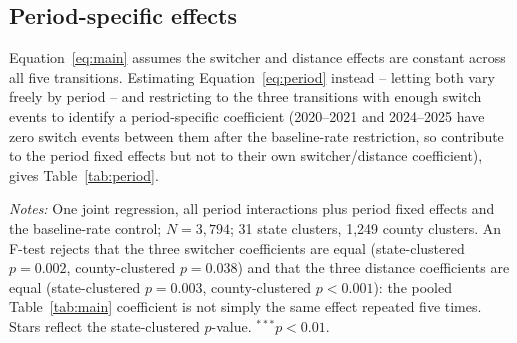 \documentclass[preprint,12pt,authoryear]{elsarticle}
\begin{document}
\subsection{Period-specific effects}
\label{sec:periodeffects}

Equation~\ref{eq:main} assumes the switcher and distance effects are
constant across all five transitions. Estimating Equation~\ref{eq:period}
instead -- letting both vary freely by period -- and restricting to
the three transitions with enough switch events to identify a
period-specific coefficient (2020--2021 and 2024--2025 have zero
switch events between them after the baseline-rate restriction, so
contribute to the period fixed effects but not to their own
switcher/distance coefficient), gives Table~\ref{tab:period}.

\begin{table}[htbp]
\centering
\caption{Period-specific switcher and distance coefficients}
\label{tab:period}
\vspace{2pt}
\begin{minipage}{0.9\textwidth}
\footnotesize\emph{Notes:} One joint regression, all period
interactions plus period fixed effects and the baseline-rate control;
$N=3{,}794$; 31 state clusters, 1{,}249 county clusters. An F-test
rejects that the three switcher coefficients are equal (state-clustered
$p=0.002$, county-clustered $p=0.038$) and that the three distance
coefficients are equal (state-clustered $p=0.003$, county-clustered
$p<0.001$): the pooled Table~\ref{tab:main} coefficient is not simply
the same effect repeated five times. Stars reflect the state-clustered
$p$-value. $^{***}p<0.01$.
\end{minipage}
\end{table}
\end{document}
